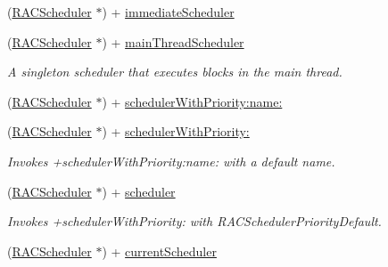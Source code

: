 \begin{DoxyCompactItemize}
\item 
(\mbox{\hyperlink{interface_r_a_c_scheduler}{R\+A\+C\+Scheduler}} $\ast$) + \mbox{\hyperlink{interface_r_a_c_scheduler_a78433c164c6e6ca6628eef47c9c087e3}{immediate\+Scheduler}}
\item 
\mbox{\label{interface_r_a_c_scheduler_a1672712ac42bf63c524c7ae3a355bdd0}} 
(\mbox{\hyperlink{interface_r_a_c_scheduler}{R\+A\+C\+Scheduler}} $\ast$) + \mbox{\hyperlink{interface_r_a_c_scheduler_a1672712ac42bf63c524c7ae3a355bdd0}{main\+Thread\+Scheduler}}
\begin{DoxyCompactList}\small\item\em A singleton scheduler that executes blocks in the main thread. \end{DoxyCompactList}\item 
(\mbox{\hyperlink{interface_r_a_c_scheduler}{R\+A\+C\+Scheduler}} $\ast$) + \mbox{\hyperlink{interface_r_a_c_scheduler_a28259d5d6caccd1c459f85154d9aca9a}{scheduler\+With\+Priority\+:name\+:}}
\item 
\mbox{\label{interface_r_a_c_scheduler_aa50568b10bf46f6e9703afd9624224ad}} 
(\mbox{\hyperlink{interface_r_a_c_scheduler}{R\+A\+C\+Scheduler}} $\ast$) + \mbox{\hyperlink{interface_r_a_c_scheduler_aa50568b10bf46f6e9703afd9624224ad}{scheduler\+With\+Priority\+:}}
\begin{DoxyCompactList}\small\item\em Invokes +scheduler\+With\+Priority\+:name\+: with a default name. \end{DoxyCompactList}\item 
\mbox{\label{interface_r_a_c_scheduler_a51cc8cbd6c8f2239f6aa53c63f635305}} 
(\mbox{\hyperlink{interface_r_a_c_scheduler}{R\+A\+C\+Scheduler}} $\ast$) + \mbox{\hyperlink{interface_r_a_c_scheduler_a51cc8cbd6c8f2239f6aa53c63f635305}{scheduler}}
\begin{DoxyCompactList}\small\item\em Invokes +scheduler\+With\+Priority\+: with R\+A\+C\+Scheduler\+Priority\+Default. \end{DoxyCompactList}\item 
(\mbox{\hyperlink{interface_r_a_c_scheduler}{R\+A\+C\+Scheduler}} $\ast$) + \mbox{\hyperlink{interface_r_a_c_scheduler_a67734f655b47abc041b32021cf72c017}{current\+Scheduler}}
\item 
\mbox{\label{interface_r_a_c_scheduler_a6aea8454cf48d37f88bd2484286fda1f}} 

\end{DoxyCompactItemize}
